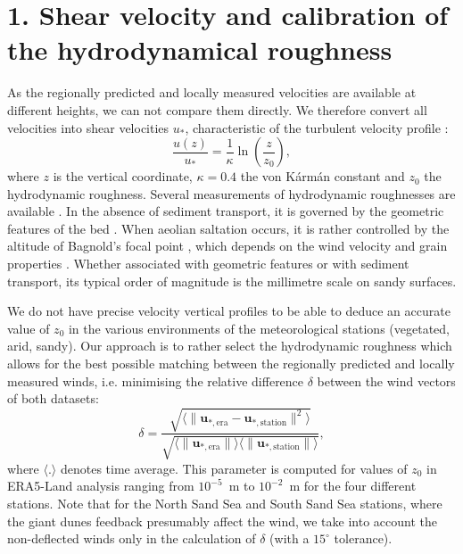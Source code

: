 \section*{1. Shear velocity and calibration of the hydrodynamical roughness}
\label{calib_z0}

As the regionally predicted and locally measured velocities are available at different heights, we can not compare them directly. We therefore convert all velocities into shear velocities $u_{*}$, characteristic of the turbulent velocity profile \citep{Spalding1961, Stull1988}:
%
\begin{equation}
\frac{u(z)}{u_{*}} = \frac{1}{\kappa}\ln\left(\frac{z}{z_{0}}\right),
\end{equation}
%
where $z$ is the vertical coordinate, $\kappa = 0.4$ the von K\'arm\'an constant and $z_{0}$ the hydrodynamic roughness. Several measurements of hydrodynamic roughnesses are available \citep{Raupach1992,Bauer1992,Brown2008,Nield2014}. In the absence of sediment transport, it is governed by the geometric features of the bed \citep{Flack2010,Pelletier2016}. When aeolian saltation occurs, it is rather controlled by the altitude of Bagnold's focal point \citep{Duran2011,Valance2015}, which depends on the wind velocity and grain properties \citep{Sherman2008, Zhang2016, Field2018}. Whether associated with geometric features or with sediment transport, its typical order of magnitude is the millimetre scale on sandy surfaces.

We do not have precise velocity vertical profiles to be able to deduce an accurate value of $z_0$ in the various environments of the meteorological stations (vegetated, arid, sandy). Our approach is to rather select the hydrodynamic roughness which allows for the best possible matching between the regionally predicted and locally measured winds, i.e. minimising the relative difference $\delta$ between the wind vectors of both datasets:
%
\begin{equation}
\label{metric_roughness}
\delta = \frac{\sqrt{\langle\| \boldsymbol{u}_{*, \textrm{era}} - \boldsymbol{u}_{*, \textrm{station}} \|^{2}\rangle}}{\sqrt{ \langle \| \boldsymbol{u}_{*, \textrm{era}} \| \rangle \langle \| \boldsymbol{u}_{*, \textrm{station}} \| \rangle}} ,
\end{equation}
%
where $\langle.\rangle$ denotes time average. This parameter is computed for values of $z_0$ in ERA5-Land analysis ranging from $10^{-5}$~m to $10^{-2}$~m for the four different stations. Note that for the North Sand Sea and South Sand Sea stations, where the giant dunes feedback presumably affect the wind, we take into account the non-deflected winds only in the calculation of $\delta$ (with a $15^\circ$ tolerance).

